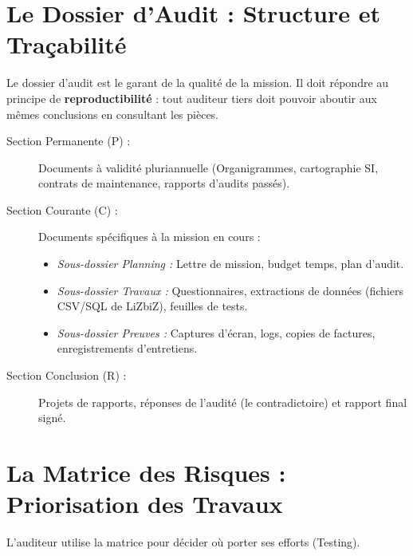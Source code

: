 \section{Le Dossier d'Audit : Structure et Traçabilité}

Le dossier d'audit est le garant de la qualité de la mission. Il doit répondre au principe de \textbf{reproductibilité} : tout auditeur tiers doit pouvoir aboutir aux mêmes conclusions en consultant les pièces.

\begin{description}
    \item[Section Permanente (P) :] Documents à validité pluriannuelle (Organigrammes, cartographie SI, contrats de maintenance, rapports d'audits passés).
    \item[Section Courante (C) :] Documents spécifiques à la mission en cours :
    \begin{itemize}
        \item \textit{Sous-dossier Planning :} Lettre de mission, budget temps, plan d'audit.
        \item \textit{Sous-dossier Travaux :} Questionnaires, extractions de données (fichiers CSV/SQL de LiZbiZ), feuilles de tests.
        \item \textit{Sous-dossier Preuves :} Captures d'écran, logs, copies de factures, enregistrements d'entretiens.
    \end{itemize}
    \item[Section Conclusion (R) :] Projets de rapports, réponses de l'audité (le contradictoire) et rapport final signé.
\end{description}

\section{La Matrice des Risques : Priorisation des Travaux}

L'auditeur utilise la matrice pour décider où porter ses efforts (Testing). 

